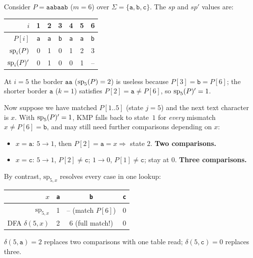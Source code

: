 \begin{example}[$sp'$ vs.\ $\mathrm{sp}_{i,x}$ for $P = \texttt{aabaab}$]
\label{ex:sp-vs-spix}
Consider $P = \texttt{aabaab}$ ($m=6$) over $\Sigma=\{\texttt{a},\texttt{b},\texttt{c}\}$.
The $sp$ and $sp'$ values are:

\begin{center}
\begin{tabular}{rcccccc}
  \toprule
  $i$            & 1 & 2 & 3 & 4 & 5 & 6 \\
  \midrule
  $P[i]$         & \texttt{a} & \texttt{a} & \texttt{b} & \texttt{a} & \texttt{a} & \texttt{b} \\
  $\mathrm{sp}_{i}(P)$      & 0 & 1 & 0 & 1 & 2 & 3 \\
  $\mathrm{sp}_{i}(P)'$     & 0 & 1 & 0 & 0 & 1 & -- \\
  \bottomrule
\end{tabular}
\end{center}

At $i=5$ the border $\texttt{aa}$ ($\mathrm{sp}_{5}(P)=2$) is useless because $P[3]=\texttt{b}=P[6]$;
the shorter border $\texttt{a}$ ($k=1$) satisfies $P[2]=\texttt{a}\neq P[6]$, so
$\mathrm{sp}_{5}(P)'=1$.

Now suppose we have matched $P[1..5]$ (state $j=5$) and the next text character is $x$.
With $\mathrm{sp}_{5}(P)'=1$, KMP falls back to state~$1$ for \emph{every} mismatch
$x \neq P[6]=\texttt{b}$, and may still need further comparisons depending on $x$:
\begin{itemize}[topsep=4pt, itemsep=3pt]
  \item $x=\texttt{a}$: $5\to 1$, then $P[2]=\texttt{a}=x \Rightarrow$ state $2$.
        \textbf{Two comparisons.}
  \item $x=\texttt{c}$: $5\to 1$, $P[2]\neq\texttt{c}$; $1\to 0$, $P[1]\neq\texttt{c}$;
        stay at $0$. \textbf{Three comparisons.}
\end{itemize}
By contrast, $\mathrm{sp}_{5,x}$ resolves every case in one lookup:

\begin{center}
\begin{tabular}{rccc}
  \toprule
  $x$                      & \texttt{a} & \texttt{b} & \texttt{c} \\
  \midrule
  $\mathrm{sp}_{5,x}$     & 1 & -- \textnormal{\scriptsize (match $P[6]$)} & 0 \\[3pt]
  DFA $\delta(5,x)$        & 2 & 6 \textnormal{\scriptsize (full match!)}   & 0 \\
  \bottomrule
\end{tabular}
\end{center}

$\delta(5,\texttt{a})=2$ replaces two comparisons with one table read;
$\delta(5,\texttt{c})=0$ replaces three.
\end{example}


